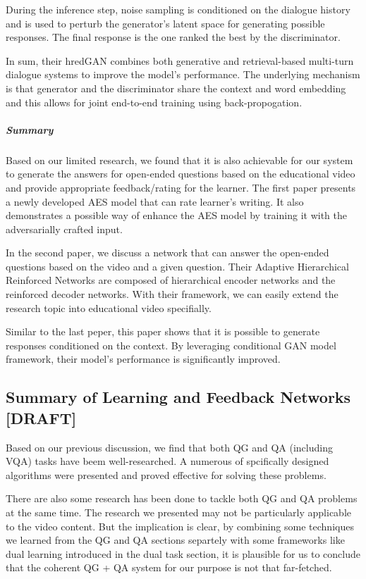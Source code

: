 \documentclass[]{book}
\let\oldsubparagraph\subparagraph
\renewcommand{\subparagraph}[1]{\oldsubparagraph{#1}\mbox{}}
\theoremstyle{definition}
\theoremstyle{definition}
\theoremstyle{definition}
\theoremstyle{remark}
\begin{document}
During the inference step, noise sampling is conditioned on the dialogue
history and is used to perturb the generator's latent space for
generating possible responses. The final response is the one ranked the
best by the discriminator.

In sum, their hredGAN combines both generative and retrieval-based
multi-turn dialogue systems to improve the model's performance. The
underlying mechanism is that generator and the discriminator share the
context and word embedding and this allows for joint end-to-end training
using back-propogation.

\subparagraph{Summary}\label{summary-2}

Based on our limited research, we found that it is also achievable for
our system to generate the answers for open-ended questions based on the
educational video and provide appropriate feedback/rating for the
learner. The first paper presents a newly developed AES model that can
rate learner's writing. It also demonstrates a possible way of enhance
the AES model by training it with the adversarially crafted input.

In the second paper, we discuss a network that can answer the open-ended
questions based on the video and a given question. Their Adaptive
Hierarchical Reinforced Networks are composed of hierarchical encoder
networks and the reinforced decoder networks. With their framework, we
can easily extend the research topic into educational video specifially.

Similar to the last peper, this paper shows that it is possible to
generate responses conditioned on the context. By leveraging conditional
GAN model framework, their model's performance is significantly
improved.

\subsection{Summary of Learning and Feedback Networks
{[}DRAFT{]}}\label{summary-of-learning-and-feedback-networks-draft}

Based on our previous discussion, we find that both QG and QA (including
VQA) tasks have beem well-researched. A numerous of spcifically designed
algorithms were presented and proved effective for solving these
problems.

There are also some research has been done to tackle both QG and QA
problems at the same time. The research we presented may not be
particularly applicable to the video content. But the implication is
clear, by combining some techniques we learned from the QG and QA
sections separtely with some frameworks like dual learning introduced in
the dual task section, it is plausible for us to conclude that the
coherent QG + QA system for our purpose is not that far-fetched.
\end{document}
